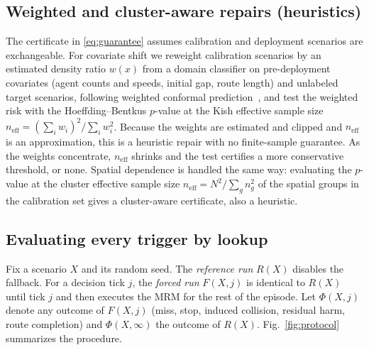 \documentclass[lettersize,journal]{IEEEtran}
\begin{document}
\subsection{Weighted and cluster-aware repairs (heuristics)}
\label{sec:shift}
The certificate in \eqref{eq:guarantee} assumes calibration and
deployment scenarios are exchangeable. For covariate shift we reweight
calibration scenarios by an estimated density ratio $w(x)$ from a domain
classifier on pre-deployment covariates (agent counts and speeds, initial
gap, route length) and unlabeled target scenarios, following weighted
conformal prediction~\cite{tibshirani2019}, and test the weighted risk with
the Hoeffding--Bentkus $p$-value at the Kish effective sample size
$n_{\mathrm{eff}} = (\sum_i w_i)^2 / \sum_i w_i^2$. Because the weights are
estimated and clipped and $n_{\mathrm{eff}}$ is an approximation, this is a
heuristic repair with no finite-sample guarantee. As the weights
concentrate, $n_{\mathrm{eff}}$ shrinks and the test certifies a more
conservative threshold, or none. Spatial dependence is handled the same way: evaluating the $p$-value at the cluster effective sample size $n_{\mathrm{eff}} = N^2/\sum_g n_g^2$ of the spatial groups in the calibration set gives a cluster-aware certificate, also a heuristic.

\subsection{Evaluating every trigger by lookup}
\label{sec:exact-eval}
Fix a scenario $X$ and its random seed. The \emph{reference run}
$R(X)$ disables the fallback. For a decision tick $j$, the \emph{forced
run} $F(X,j)$ is identical to $R(X)$ until tick $j$ and then executes the
MRM for the rest of the episode. Let $\Phi(X,j)$ denote any outcome of
$F(X,j)$ (miss, stop, induced collision, residual harm, route completion)
and $\Phi(X,\infty)$ the outcome of $R(X)$. Fig.~\ref{fig:protocol}
summarizes the procedure.
\end{document}

